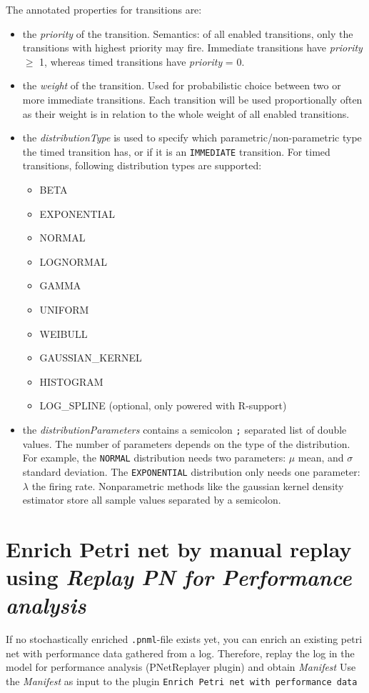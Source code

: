The annotated properties for transitions are:
\begin{itemize}
  \item the \emph{priority} of the transition. Semantics: of all enabled transitions, only the transitions with highest priority may fire. Immediate transitions have \emph{priority} $\geq$ 1, whereas timed transitions have \emph{priority} = 0.  
  \item the \emph{weight} of the transition. Used for probabilistic choice between two or more immediate transitions. Each transition will be used proportionally often as their weight is in relation to the whole weight of all enabled transitions.
  \item the \emph{distributionType} is used to specify which parametric/non-parametric type the timed transition has, or if it is an \texttt{IMMEDIATE} transition. For timed transitions, following distribution types are supported:
  \begin{itemize}
    \item BETA
    \item EXPONENTIAL
    \item NORMAL
    \item LOGNORMAL
    \item GAMMA
    \item UNIFORM
    \item WEIBULL
    \item GAUSSIAN\_KERNEL
    \item HISTOGRAM
    \item LOG\_SPLINE (optional, only powered with R-support) 
  \end{itemize}
  \item the \emph{distributionParameters} contains a semicolon \texttt{;} separated list of double values. The number of parameters depends on the type of the distribution. For example, the \texttt{NORMAL} distribution needs two parameters: $\mu$ mean, and $\sigma$ standard deviation.
  The \texttt{EXPONENTIAL} distribution only needs one parameter: $\lambda$ the firing rate.
  Nonparametric methods like the gaussian kernel density estimator store all sample values separated by a semicolon.
\end{itemize}

\section*{Enrich Petri net by manual replay using \emph{Replay PN for Performance analysis}}
If no stochastically enriched \texttt{.pnml}-file exists yet, you can enrich an existing petri net with performance data gathered from a log. 
Therefore, replay the log in the model for performance analysis (PNetReplayer plugin) and obtain \emph{Manifest}
Use the \emph{Manifest} as input to the plugin \texttt{Enrich Petri net with performance data}

